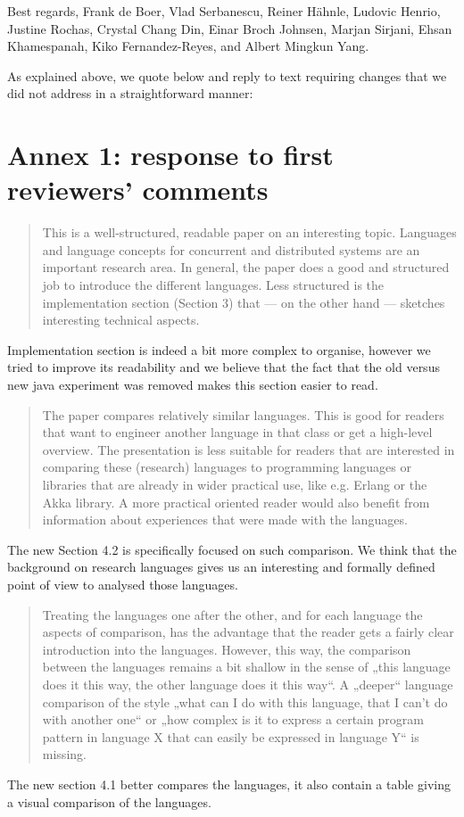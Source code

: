 \documentclass{article}
\begin{document}
\noindent
Best regards,
\newline
\noindent
Frank de Boer, Vlad Serbanescu,
	Reiner H\"ahnle,
	Ludovic Henrio, Justine Rochas,
	Crystal Chang Din, Einar Broch Johnsen,
	Marjan Sirjani,
	Ehsan Khamespanah,
	Kiko Fernandez-Reyes, and Albert Mingkun Yang.

\newpage
As explained above, we quote below and reply to text requiring changes that we did not 
address in a straightforward manner:

\section*{Annex 1: response to first reviewers' comments}

\begin{quote}
This is a well-structured, readable paper on an interesting topic. Languages and language 
concepts for concurrent and distributed systems are an important research area. In 
general, the paper does a good and structured job to introduce the different languages. 
Less structured is the implementation section (Section 3) that — on the other hand — 
sketches interesting technical aspects.
\end{quote}
Implementation section is indeed a bit more complex to organise, however we tried to 
improve its readability and we believe that the fact that the old versus new java 
experiment was removed makes this section easier to read.

\begin{quote}
The paper compares relatively similar languages. This is good for readers that want to 
engineer another language in that class or get a high-level overview. The presentation is 
less suitable for readers that are interested in comparing these (research) languages to 
programming languages or libraries that are already in wider practical use, like e.g. 
Erlang or the Akka library. A more practical oriented reader would also benefit from 
information about experiences that were made with the languages.
\end{quote}
The new Section 4.2 is specifically focused on such comparison. We think that the 
background on research languages gives us an interesting and formally defined point of 
view to analysed those languages.

\begin{quote}
Treating the languages one after the other, and for each language the aspects of 
comparison, has the advantage that the reader gets a fairly clear introduction into the 
languages. However, this way, the comparison between the languages remains a bit shallow 
in the sense of „this language does it this way, the other language does it this way“. A 
„deeper“ language comparison of the style „what can I do with this language, that I can’t 
do with another one“ or „how complex is it to express a certain program pattern in 
language X that can easily be expressed in language Y“ is missing. 
\end{quote}
The new section 4.1 better compares the languages, it also contain a table giving a 
visual comparison of the languages.
\end{document}
